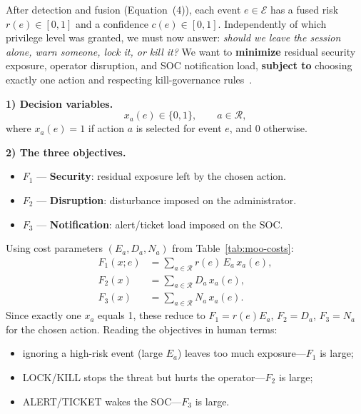 \documentclass{ieeeaccess}
\begin{document}
After detection and fusion (Equation~(4)), each event $e\in\mathcal{E}$ has a fused risk $r(e)\in[0,1]$ and a confidence $c(e)\in[0,1]$. Independently of which privilege level was granted, we must now answer: \textit{should we leave the session alone, warn someone, lock it, or kill it?} We want to \textbf{minimize} residual security exposure, operator disruption, and SOC notification load, \textbf{subject to} choosing exactly one action and respecting kill-governance rules~\cite{ref14,ref15}.

\textbf{1) Decision variables.}
\begin{equation}
x_a(e)\in\{0,1\}, \qquad a\in\mathcal{R},
\tag{5.0}
\end{equation}
where $x_a(e)=1$ if action $a$ is selected for event $e$, and $0$ otherwise.

\textbf{2) The three objectives.}
\begin{itemize}
\item $F_1$ --- \textbf{Security}: residual exposure left by the chosen action.
\item $F_2$ --- \textbf{Disruption}: disturbance imposed on the administrator.
\item $F_3$ --- \textbf{Notification}: alert/ticket load imposed on the SOC.
\end{itemize}
Using cost parameters $(E_a,D_a,N_a)$ from Table~\ref{tab:moo-costs}:
\begin{align}
F_1(x;e)
&=
\sum_{a\in\mathcal{R}} r(e)\, E_a\, x_a(e),
\tag{5.1}\\
F_2(x)
&=
\sum_{a\in\mathcal{R}} D_a\, x_a(e),
\tag{5.2}\\
F_3(x)
&=
\sum_{a\in\mathcal{R}} N_a\, x_a(e).
\tag{5.3}
\end{align}
Since exactly one $x_a$ equals 1, these reduce to $F_1=r(e)E_a$, $F_2=D_a$, $F_3=N_a$ for the chosen action. Reading the objectives in human terms:
\begin{itemize}
\item ignoring a high-risk event (large $E_a$) leaves too much exposure---$F_1$ is large;
\item LOCK/KILL stops the threat but hurts the operator---$F_2$ is large;
\item ALERT/TICKET wakes the SOC---$F_3$ is large.
\end{itemize}
\end{document}
